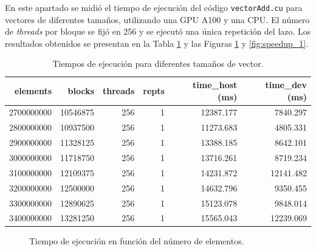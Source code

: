 \documentclass{article}
\begin{document}
			En este apartado se midió el tiempo de ejecución del código \texttt{vectorAdd.cu} para vectores de diferentes tamaños, utilizando una GPU A100 y una CPU. El número de \textit{threads} por bloque se fijó en 256 y se ejecutó una única repetición del lazo. Los resultados obtenidos se presentan en la Tabla \ref{tab:resultados1} y las Figuras \ref{fig:time_vs_elements_1} y \ref{fig:speedup_1}.

			\begin{table}[H]
				\centering
				\begin{adjustbox}{width=\textwidth, keepaspectratio}
					\begin{tabular}{|r|r|r|r|r|r|}
						\hline
						elements & blocks & threads & repts & time\_host (ms) & time\_dev (ms) \\ \hline
						2700000000 & 10546875 & 256 & 1 & 12387.177 & 7840.297 \\ \hline
						2800000000 & 10937500 & 256 & 1 & 11273.683 & 4805.331 \\ \hline
						2900000000 & 11328125 & 256 & 1 & 13388.185 & 8642.101 \\ \hline
						3000000000 & 11718750 & 256 & 1 & 13716.261 & 8719.234 \\ \hline
						3100000000 & 12109375 & 256 & 1 & 14231.872 & 12141.482 \\ \hline
						3200000000 & 12500000 & 256 & 1 & 14632.796 & 9350.455 \\ \hline
						3300000000 & 12890625 & 256 & 1 & 15123.078 & 9848.014 \\ \hline
						3400000000 & 13281250 & 256 & 1 & 15565.043 & 12239.069 \\ \hline
					\end{tabular}
				\end{adjustbox}
				\caption{Tiempos de ejecución para diferentes tamaños de vector.}
				\label{tab:resultados1}
			\end{table}

			\begin{figure}[H]
				\centering
				\caption{Tiempo de ejecución en función del número de elementos.}
				\label{fig:time_vs_elements_1}
			\end{figure}
\end{document}

